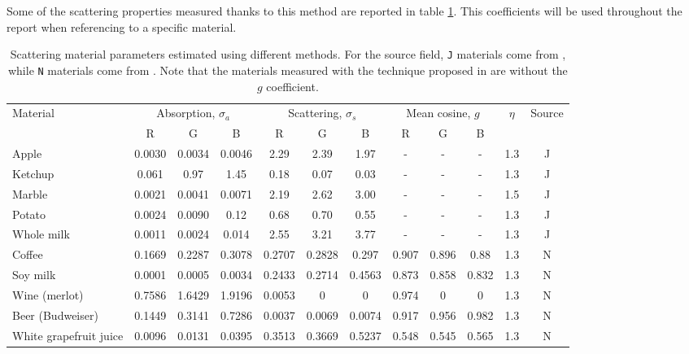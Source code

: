 Some of the scattering properties measured thanks to this method are reported in table \ref{table:scatteringcoefficients}. This coefficients will be used throughout the report when referencing to a specific material.
\clearpage
\begin{landscape}
\renewcommand{\arraystretch}{1.8}
\begin{table}[!ht]
    \centering
    \begin{tabular}{|l|ccc|ccc|ccc|c|c|}
    \hline
    \multirow{2}{*}{Material}               & \multicolumn{3}{|c|}{Absorption, $\sigma_a$}     & \multicolumn{3}{|c|}{Scattering, $\sigma_s$}     & \multicolumn{3}{|c|}{Mean cosine, $g$}    & \multirow{2}{*}{$\eta$} & \multirow{2}{*}{Source} \\ 
               &R& G      & B     & R & G      & B      & R   & G     & B     &  &  \\ \hline
    {Apple}                  & 0.0030 & 0.0034 & 0.0046 & 2.29   & 2.39   & 1.97   & -     & -     & -     & 1.3    & J      \\
    {Ketchup}                & 0.061  & 0.97   & 1.45   & 0.18   & 0.07   & 0.03   & -     & -     & -     & 1.3    & J      \\
    {Marble}                 & 0.0021 & 0.0041 & 0.0071 & 2.19   & 2.62   & 3.00   & -     & -     & -     & 1.5    & J      \\
    {Potato}                 & 0.0024 & 0.0090 & 0.12   & 0.68   & 0.70   & 0.55   & -     & -     & -     & 1.3    & J      \\
    {Whole milk}             & 0.0011 & 0.0024 & 0.014  & 2.55   & 3.21   & 3.77   & -     & -     & -     & 1.3    & J      \\
    {Coffee}                 & 0.1669 & 0.2287 & 0.3078 & 0.2707 & 0.2828 & 0.297  & 0.907 & 0.896 & 0.88  & 1.3    & N    \\
    {Soy milk}               & 0.0001 & 0.0005 & 0.0034 & 0.2433 & 0.2714 & 0.4563 & 0.873 & 0.858 & 0.832 & 1.3    & N      \\
    {Wine (merlot)   }       & 0.7586 & 1.6429 & 1.9196 & 0.0053 & 0      & 0      & 0.974 & 0     & 0     & 1.3    & N      \\
    {Beer (Budweiser)}       & 0.1449 & 0.3141 & 0.7286 & 0.0037 & 0.0069 & 0.0074 & 0.917 & 0.956 & 0.982 & 1.3    & N      \\
    {White grapefruit juice} & 0.0096 & 0.0131 & 0.0395 & 0.3513 & 0.3669 & 0.5237 & 0.548 & 0.545 & 0.565 & 1.3    & N      \\ \hline
    \end{tabular}
		\caption{Scattering material parameters estimated using different methods. For the source field, \texttt{J} materials come from \cite{Jensen:2001:PMS:383259.383319}, while \texttt{N} materials come from \cite{Narasimhan:2006:ASP:1141911.1141986}. Note that the materials measured with the technique proposed in \cite{Jensen:2001:PMS:383259.383319} are without the $g$ coefficient.}
		\label{table:scatteringcoefficients}
\end{table}
\end{landscape}
\clearpage


